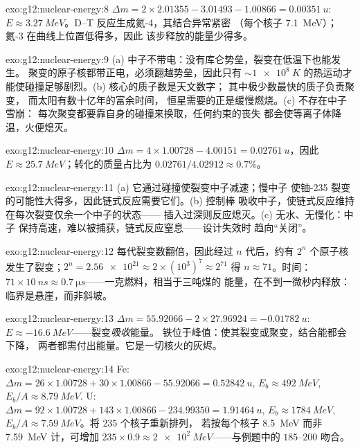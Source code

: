 \begin{solution}{exo:g12:nuclear-energy:8}
$\Delta m = 2 \times 2.01355 - 3.01493 - 1.00866 = \qty{0.00351}{u}$:
$E \approx \qty{3.27}{MeV}$。D--T 反应生成氦-4，其结合异常紧密
（每个核子 \qty{7.1}{MeV}）；氦-3 在曲线上位置低得多，因此
该步释放的能量少得多。
\end{solution}

\begin{solution}{exo:g12:nuclear-energy:9}
(a) 中子不带电：没有库仑势垒，裂变在低温下也能发生。
聚变的原子核都带正电，必须翻越势垒，因此只有
$\sim \qty{1e8}{K}$ 的热运动才能使碰撞足够剧烈。(b) 核心的质子数是天文数字；
其中极少数最快的质子负责聚变，
而太阳有数十亿年的富余时间，
恒星需要的正是缓慢燃烧。(c) 不存在中子雪崩：
每次聚变都要靠自身的碰撞来换取，任何约束的丧失
都会使等离子体降温，火便熄灭。
\end{solution}

\begin{solution}{exo:g12:nuclear-energy:10}
$\Delta m = 4 \times 1.00728 - 4.00151 = \qty{0.02761}{u}$，因此
$E \approx \qty{25.7}{MeV}$；转化的质量占比为
$0.02761/4.02912 \approx 0.7\%$。
\end{solution}

\begin{solution}{exo:g12:nuclear-energy:11}
(a) 它通过碰撞使裂变中子减速；慢中子
使铀-235 裂变的可能性大得多，因此链式反应需要它们。(b) 控制棒
吸收中子，使链式反应维持在每次裂变仅余一个中子的状态——
插入过深则反应熄灭。(c) 无水、无慢化：中子
保持高速，难以被捕获，链式反应窒息——设计失效时
趋向“关闭”。
\end{solution}

\begin{solution}{exo:g12:nuclear-energy:12}
每代裂变数翻倍，因此经过 $n$ 代后，约有 $2^n$
个原子核发生了裂变；$2^{n} = \num{2.56e21} \approx 2 \times (10^{3})^{7}
\approx 2^{71}$ 得 $n \approx 71$。时间：$71 \times \qty{10}{ns}
\approx \qty{0.7}{\micro s}$——一克燃料，相当于三吨煤的
能量，在不到一微秒内释放：临界是悬崖，而非斜坡。
\end{solution}

\begin{solution}{exo:g12:nuclear-energy:13}
$\Delta m = 55.92066 - 2 \times 27.96924 = \qty{-0.01782}{u}$:
$E \approx \qty{-16.6}{MeV}$——裂变\emph{吸收}能量。
铁位于峰值：使其裂变或聚变，结合能都会下降，
两者都需付出能量。它是一切核火的灰烬。
\end{solution}

\begin{solution}{exo:g12:nuclear-energy:14}
Fe: $\Delta m = 26 \times 1.00728 + 30 \times 1.00866 - 55.92066 =
\qty{0.52842}{u}$, $E_b \approx \qty{492}{MeV}$, $E_b/A \approx
\qty{8.79}{MeV}$. U: $\Delta m = 92 \times 1.00728 + 143 \times
1.00866 - 234.99350 = \qty{1.91464}{u}$, $E_b \approx \qty{1784}{MeV}$,
$E_b/A \approx \qty{7.59}{MeV}$。将 $235$ 个核子重新排列，
若按每个核子 \qty{8.5}{MeV} 而非 \qty{7.59}{MeV} 计，可增加 $235 \times 0.9
\approx \qty{2e2}{MeV}$——与例题中的 $185$--$200$ 吻合。
\end{solution}

